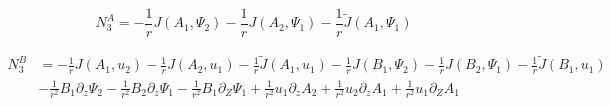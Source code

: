 \documentclass{emulateapj}
\newcommand{\beq}{\begin{equation}}
\newcommand{\eeq}{\end{equation}}
\begin{document}
\beq
N_3^A = -\frac{1}{r} J\left(A_1, \Psi_2\right) - \frac{1}{r}J\left(A_2, \Psi_1\right) - \frac{1}{r} \widetilde{J}\left(A_1, \Psi_1\right)
\eeq

\beq
\begin{split}
N_3^B & = - \frac{1}{r} J\left(A_1, u_2\right) - \frac{1}{r} J\left(A_2, u_1\right) - \frac{1}{r}\widetilde{J}\left(A_1, u_1\right) - \frac{1}{r} J\left(B_1, \Psi_2\right) - \frac{1}{r} J\left(B_2, \Psi_1\right) - \frac{1}{r} \widetilde{J} \left(B_1, u_1\right) \\ & - \frac{1}{r^2} B_1\partial_z \Psi_2 - \frac{1}{r^2} B_2 \partial_z \Psi_1 - \frac{1}{r^2} B_1 \partial_Z \Psi_1 + \frac{1}{r^2} u_1 \partial_z A_2 + \frac{1}{r^2} u_2 \partial_z A_1 + \frac{1}{r^2} u_1 \partial_Z A_1
\end{split}
\eeq



\end{document}
